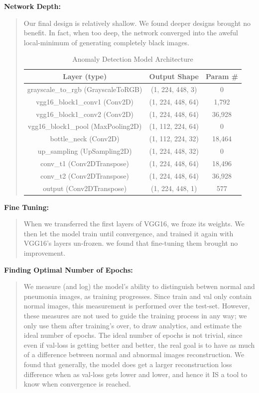 \documentclass{article}
\begin{document}
\textbf{Network Depth:} 
\begin{quote}
Our final design is relatively shallow. We found deeper designs brought no benefit. In fact, when too deep, the network converged into the aweful local-minimum of generating completely black images.

\begin{table}[h]
  \centering
  \caption{Anomaly Detection Model Architecture}
  \label{tab:anomaly_model_architecture}
  \begin{tabular}{|c|c|c|}
    \hline
    \textbf{Layer (type)} & \textbf{Output Shape} & \textbf{Param \#} \\
    \hline
    grayscale\_to\_rgb (GrayscaleToRGB) & (1, 224, 448, 3) & 0 \\
    \hline
    vgg16\_block1\_conv1 (Conv2D) & (1, 224, 448, 64) & 1,792 \\
    \hline
    vgg16\_block1\_conv2 (Conv2D) & (1, 224, 448, 64) & 36,928 \\
    \hline
    vgg16\_block1\_pool (MaxPooling2D) & (1, 112, 224, 64) & 0 \\
    \hline
    bottle\_neck (Conv2D) & (1, 112, 224, 32) & 18,464 \\
    \hline
    up\_sampling (UpSampling2D) & (1, 224, 448, 32) & 0 \\
    \hline
    conv\_t1 (Conv2DTranspose) & (1, 224, 448, 64) & 18,496 \\
    \hline
    conv\_t2 (Conv2DTranspose) & (1, 224, 448, 64) & 36,928 \\
    \hline
    output (Conv2DTranspose) & (1, 224, 448, 1) & 577 \\
    \hline
  \end{tabular}
\end{table}

\end{quote}

\textbf{Fine Tuning:}
\begin{quote}
When we transferred the first layers of VGG16, we froze its weights. We then let the model train until convergence, and trained it again with VGG16's layers un-frozen. we found that fine-tuning them brought no improvement.
\end{quote}


\textbf{Finding Optimal Number of Epochs:}
\begin{quote}
We measure (and log) the model's ability to distinguish betwen normal and pneumonia images, as training progresses. Since train and val only contain normal images, this measurement is performed over the test-set.
However, these measures are not used to guide the training process in any way; we only use them after training's over, to draw analytics, and estimate the ideal number of epochs. The ideal number of epochs is not trivial, since even if val-loss is getting better and better, the real goal is to have as much of a difference between normal and abnormal images reconstruction. We found that generally, the model does get a larger reconstruction loss difference when as val-loss gets lower and lower, and hence it IS a tool to know when convergence is reached.
\end{quote}
\end{document}
